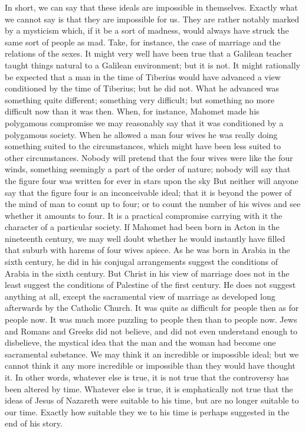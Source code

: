 In short, we can say that these ideals are impossible in themselves. Exactly what we cannot say is that they are impossible for us. They are rather notably marked by a mysticism which, if it be a sort of madness, would always have struck the same sort of people as mad. Take, for instance, the case of marriage and the relations of the sexes. It might very well have been true that a Galilean teacher taught things natural to a Galilean environment; but it is not. It might rationally be expected that a man in the time of Tiberius would have advanced a view conditioned by the time of Tiberius; but he did not. What he advanced was something quite different; something very difficult; but something no more difficult now than it was then. When, for instance, Mahomet made his polygamous compromise we may reasonably say that it was conditioned by a polygamous society. When he allowed a man four wives he was really doing something suited to the circumstances, which might have been less suited to other circumstances. Nobody will pretend that the four wives were like the four winds, something seemingly a part of the order of nature; nobody will say that the figure four was written for ever in stars upon the sky But neither will anyone say that the figure four is an inconceivable ideal; that it is beyond the power of the mind of man to count up to four; or to count the number of his wives and see whether it amounts to four. It is a practical compromise carrying with it the character of a particular society. If Mahomet had been born in Acton in the nineteenth century, we may well doubt whether he would instantly have filled that suburb with harems of four wives apiece. As he was born in Arabia in the sixth century, he did in his conjugal arrangements suggest the conditions of Arabia in the sixth century. But Christ in his view of marriage does not in the least suggest the conditions of Palestine of the first century. He does not suggest anything at all, except the sacramental view of marriage as developed long afterwards by the Catholic Church. It was quite as difficult for people then as for people now. It was much more puzzling to people then than to people now. Jews and Romans and Greeks did not believe, and did not even understand enough to disbelieve, the mystical idea that the man and the woman had become one sacramental substance. We may think it an incredible or impossible ideal; but we cannot think it any more incredible or impossible than they would have thought it. In other words, whatever else is true, it is not true that the controversy has been altered by time. Whatever else is true, it is emphatically not true that the ideas of Jesus of Nazareth were suitable to his time, but are no longer suitable to our time. Exactly how suitable they we to his time is perhaps suggested in the end of his story.

